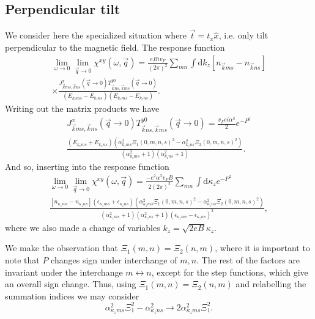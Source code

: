 \subsection{Perpendicular tilt}
\label{sec:perptiltsum}
We consider here the specialized situation where \( \vec{t} = t_x \hat{x} \), i.e. only tilt perpendicular to the magnetic field.
The response function
\begin{multline*}
  \lim_{\omega \to 0} \lim_{\vec{q} \to 0} \chi^{xy}(\omega, \vec{q}) =
  \frac{e B i v_F}{(2 \pi)^2}
  \sum\limits_{mn}^{} \int \mathrm{d}k_z [n_{\vec{k} m s} - n_{\vec{k} n s}]\\
  \times \frac{
    J^x_{\vec{k} m s, \vec{k} ns} (\vec{q}\to 0) T^{y 0}_{\vec{k} n s, \vec{k}ms}(\vec{q} \to 0)
  }{
    (E_{k_z m s} - E_{k_z ns})(E_{k_z m s}-E_{k_z ns})
  }.
\end{multline*}
Writing out the matrix products we have
\begin{multline}
  J^x_{\vec{k} m s, \vec{k} ns} (\vec{q} \to 0) T^{y 0}_{\vec{k} n s, \vec{k}ms}(\vec{q} \to 0)
  =
  \frac{v_F e i \alpha^{3}}{2}
  e^{-P^2}\\
  \frac{
    (E_{k_{z} m s} + E_{k_z n s})
    (\alpha_{k_z m s}^2 \Xi_1(0, m,n, s)^2 - \alpha_{k_z n s}^2 \Xi_2(0, m,n, s)^2)
  }{
    (\alpha_{k_z m s}^2 + 1)(\alpha_{k_z n s}^2 + 1)
  }.
  \label{eq:114}
\end{multline}
And so, inserting into the response function
\begin{multline}
  \label{eq:115}
  \lim_{\omega \to 0} \lim_{\vec{q} \to 0} \chi^{xy}(\omega, \vec{q}) =
  \frac{- e^2 \alpha^3 v_F B }{2 (2 \pi)^2 }
  \sum\limits_{mn}^{}
  \int \mathrm{d}\kappa_z
  e^{-P^2}\\
  \frac{
    [n_{\kappa_z m s} - n_{\kappa_z n s}]
    (\epsilon_{\kappa_z m s} + \epsilon_{\kappa_z n s})
    (\alpha_{\kappa_z m s}^2 \Xi_1(0, m,n, s)^2 - \alpha_{\kappa_z n s}^2 \Xi_2(0, m,n, s)^2)
  }{
    (\alpha_{\kappa_z m s}^2 + 1)(\alpha_{\kappa_z n s}^2 + 1)
    (\epsilon_{\kappa_z m s} - \epsilon_{\kappa_z ns})^2
  },
\end{multline}
where we also made a change of variables \( k_z = \sqrt{2 e B} \kappa_z \).

We make the observation that \( \Xi _1(m, n) = \Xi _2(n, m) \), where it is important to note that \( P \) changes sign under interchange of \( m,n \).
The rest of the factors are invariant under the interchange \( m \leftrightarrow n \), except for the step functions, which give an overall sign change.
Thus, using \( \Xi _1(m, n) = \Xi _2(n, m) \) and relabelling the summation indices we may consider
\[
  \alpha_{\kappa_z m s}^2 \Xi_1^2 - \alpha_{\kappa_z n s}^2 \to 2 \alpha_{\kappa_z m s}^2 \Xi_1^2.
\]

